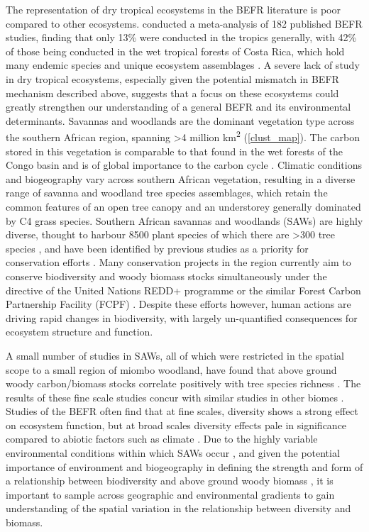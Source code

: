 \documentclass[11pt,a4paper]{article}
\newcommand{\textapprox}{\raisebox{0.5ex}{\texttildelow}}  %
\begin{document}
The representation of dry tropical ecosystems in the BEFR literature is poor compared to other ecosystems. \citet{Clarke2017} conducted a meta-analysis of 182 published BEFR studies, finding that only 13\% were conducted in the tropics generally, with 42\% of those being conducted in the wet tropical forests of Costa Rica, which hold many endemic species and unique ecosystem assemblages \citep{Barthlott2005}. A severe lack of study in dry tropical ecosystems, especially given the potential mismatch in BEFR mechanism described above, suggests that a focus on these ecosystems could greatly strengthen our understanding of a general BEFR and its environmental determinants. Savannas and woodlands are the dominant vegetation type across the southern African region, spanning >4 million km\textsuperscript{2} \citep{White1983, Ratnam2011, Ryan2016} (\autoref{clust_map}). The carbon stored in this vegetation is comparable to that found in the wet forests of the Congo basin and is of global importance to the carbon cycle \citep{Houghton2009, Mayaux2008}. Climatic conditions and biogeography vary across southern African vegetation, resulting in a diverse range of savanna and woodland tree species assemblages, which retain the common features of an open tree canopy and an understorey generally dominated by C4 grass species. Southern African savannas and woodlands (SAWs) are highly diverse, thought to harbour \textapprox{}8500 plant species of which there are >300 tree species \citep{Frost1996}, and have been identified by previous studies as a priority for conservation efforts \citep{Byers2001, Mittermeier2003}. Many conservation projects in the region currently aim to conserve biodiversity and woody biomass stocks simultaneously under the directive of the United Nations REDD+ programme or the similar Forest Carbon Partnership Facility (FCPF) \citep{Hinsley2015}. Despite these efforts however, human actions are driving rapid changes in biodiversity, with largely un-quantified consequences for ecosystem structure and function.

A small number of studies in SAWs, all of which were restricted in the spatial scope to a small region of miombo woodland, have found that above ground woody carbon/biomass stocks correlate positively with tree species richness \citep{McNicol2018, Shirima2015, Mutowo2012}. The results of these fine scale studies concur with similar studies in other biomes \citep{}. Studies of the BEFR often find that at fine scales, diversity shows a strong effect on ecosystem function, but at broad scales diversity effects pale in significance compared to abiotic factors such as climate \citep{Pasari2013}. Due to the highly variable environmental conditions within which SAWs occur \citep{Frost1996}, and given the potential importance of environment and biogeography in defining the strength and form of a relationship between biodiversity and above ground woody biomass \citep{}, it is important to sample across geographic and environmental gradients to gain understanding of the spatial variation in the relationship between diversity and biomass. 
\end{document}
